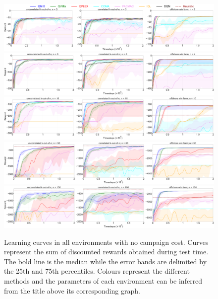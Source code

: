 \begin{figure}
\includegraphics[width=\textwidth]{tex_thesis/figures/ch5/all_3_cc_False.pdf}
\includegraphics[width=\textwidth]{tex_thesis/figures/ch5/all_5_cc_False.pdf}
\includegraphics[width=\textwidth]{tex_thesis/figures/ch5/all_10_cc_False.pdf}
\includegraphics[width=\textwidth]{tex_thesis/figures/ch5/all_50_cc_False.pdf}
\includegraphics[width=\textwidth]{tex_thesis/figures/ch5/all_100_cc_False.pdf}
\caption{
Learning curves in all environments with no campaign cost. 
Curves represent the sum of discounted rewards obtained during test time.
The bold line is the median while the error bands are delimited by the 25th and 75th percentiles.
Colours represent the different methods and the parameters of each environment can be inferred from the title above its corresponding graph.
}
    \label{fig:learning_curves_cc_false}
\end{figure}

